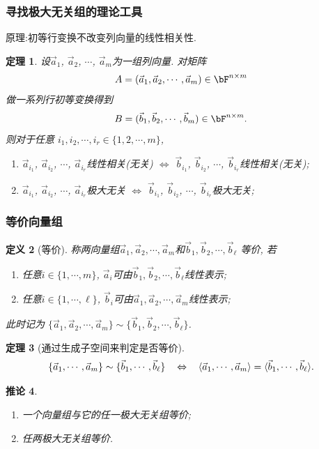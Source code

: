 \documentclass{article}
\newtheorem{theorem}{定理}  %
\newtheorem{definition}[theorem]{定义}
\newtheorem{corollary}[theorem]{推论}
\renewcommand{\blue }[1]{{\textcolor[rgb]{0,0,1}{#1}}}
\begin{document}
\subsubsection{寻找极大无关组的理论工具}
原理:初等行变换不改变列向量的线性相关性.
\begin{theorem}
设$\vec{a}_1$, $\vec{a}_2$, $\cdots$, $\vec{a}_m$为一组\blue{列}向量.  对矩阵
\[A=(\vec{a}_1,\vec{a}_2,\cdots,\vec{a}_m)\in \bF^{n\times m}\]
做一系列\blue{行}初等变换得到
\[B=(\vec{b}_1,\vec{b}_2,\cdots,\vec{b}_m)\in \bF^{n\times m}.\]
则对于任意 $i_1,i_2,\cdots,i_r\in \{1,2,\cdots,m\}$,
\begin{enumerate}
\item $\vec{a}_{i_1}$, $\vec{a}_{i_2}$, $\cdots$, $\vec{a}_{i_r}$线性相关(无关) $\Leftrightarrow$ $\vec{b}_{i_1}$, $\vec{b}_{i_2}$, $\cdots$, $\vec{b}_{i_r}$线性相关(无关);
\item $\vec{a}_{i_1}$, $\vec{a}_{i_2}$, $\cdots$, $\vec{a}_{i_r}$极大无关 $\Leftrightarrow$ $\vec{b}_{i_1}$, $\vec{b}_{i_2}$, $\cdots$, $\vec{b}_{i_r}$极大无关;
\end{enumerate}
\end{theorem}

\subsubsection{等价向量组}
\begin{definition}[等价]
称两向量组$\vec{a}_1,\vec{a}_2,\cdots,\vec{a}_m$和$\vec{b}_1,\vec{b}_2,\cdots,\vec{b}_\ell$ \blue{等价}, 若
\begin{enumerate}
\item 任意$i\in\{1,\cdots,m\}$, $\vec{a}_i$可由$\vec{b}_1,\vec{b}_2,\cdots,\vec{b}_\ell$线性表示;
\item 任意$i\in\{1,\cdots,\ell\}$, $\vec{b}_i$可由$\vec{a}_1,\vec{a}_2,\cdots,\vec{a}_m$线性表示;
\end{enumerate}
此时记为 \blue{$\{\vec{a}_1,\vec{a}_2,\cdots,\vec{a}_m\}\sim\{\vec{b}_1,\vec{b}_2,\cdots,\vec{b}_\ell\}$}.
\end{definition}
\begin{theorem}[通过生成子空间来判定是否等价]
\[\small \{\vec{a}_1,\cdots,\vec{a}_m\} \sim \{\vec{b}_1,\cdots,\vec{b}_\ell\} \quad \Leftrightarrow \quad \langle \vec{a}_1,\cdots,\vec{a}_m \rangle = \langle \vec{b}_1,\cdots,\vec{b}_\ell \rangle.\]
\end{theorem}
\begin{corollary}
\begin{enumerate}
\item 一个向量组与它的任一极大无关组等价;
\item 任两极大无关组等价.
\end{enumerate}
\end{corollary}
\end{document}
